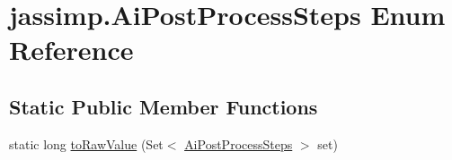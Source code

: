 \hypertarget{enumjassimp_1_1_ai_post_process_steps}{\section{jassimp.\+Ai\+Post\+Process\+Steps Enum Reference}
\label{enumjassimp_1_1_ai_post_process_steps}
}
\subsection*{Static Public Member Functions}
\begin{DoxyCompactItemize}
\item 
static long \hyperlink{enumjassimp_1_1_ai_post_process_steps_a82bc62c78eb72ebb2dd980c3939ad287}{to\+Raw\+Value} (Set$<$ \hyperlink{enumjassimp_1_1_ai_post_process_steps}{Ai\+Post\+Process\+Steps} $>$ set)
\end{DoxyCompactItemize}
